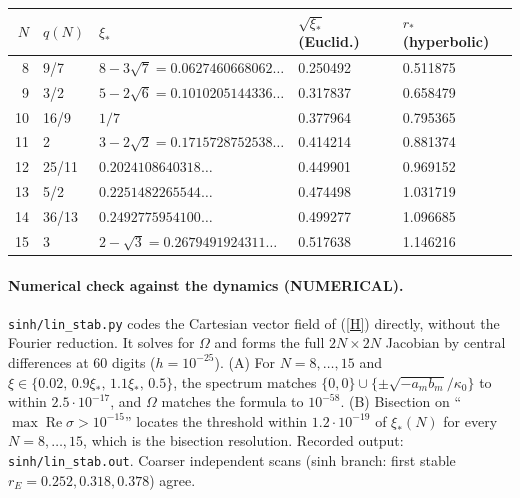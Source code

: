 \documentclass[11pt]{article}
\theoremstyle{remark}
\begin{document}
\begin{center}
\begin{tabular}{rllll}\toprule
$N$ & $q(N)$ & $\xi_*$ & $\sqrt{\xi_*}$ (Euclid.) & $r_*$ (hyperbolic)\\\midrule
8 & 9/7 & $8-3\sqrt7=0.0627460668062\ldots$ & 0.250492 & 0.511875\\
9 & 3/2 & $5-2\sqrt6=0.1010205144336\ldots$ & 0.317837 & 0.658479\\
10 & 16/9 & $1/7$ & 0.377964 & 0.795365\\
11 & 2 & $3-2\sqrt2=0.1715728752538\ldots$ & 0.414214 & 0.881374\\
12 & 25/11 & $0.2024108640318\ldots$ & 0.449901 & 0.969152\\
13 & 5/2 & $0.2251482265544\ldots$ & 0.474498 & 1.031719\\
14 & 36/13 & $0.2492775954100\ldots$ & 0.499277 & 1.096685\\
15 & 3 & $2-\sqrt3=0.2679491924311\ldots$ & 0.517638 & 1.146216\\\bottomrule
\end{tabular}
\end{center}

\paragraph{Numerical check against the dynamics (NUMERICAL).}
\texttt{sinh/lin\_stab.py} codes the Cartesian vector field of (\ref{H}) directly, without the Fourier
reduction. It solves for $\Omega$ and forms the full $2N\times2N$ Jacobian by central differences at 60
digits ($h=10^{-25}$). (A) For $N=8,\dots,15$ and $\xi\in\{0.02,\,0.9\xi_*,\,1.1\xi_*,\,0.5\}$, the spectrum
matches $\{0,0\}\cup\{\pm\sqrt{-a_mb_m}/\kappa_0\}$ to within $2.5\cdot10^{-17}$, and $\Omega$ matches the
formula to $10^{-58}$. (B) Bisection on ``$\max\operatorname{Re}\sigma>10^{-15}$'' locates the threshold
within $1.2\cdot10^{-19}$ of $\xi_*(N)$ for every $N=8,\dots,15$, which is the bisection resolution.
Recorded output: \texttt{sinh/lin\_stab.out}. Coarser independent scans (sinh branch: first stable
$r_E=0.252,0.318,0.378$) agree.
\end{document}
